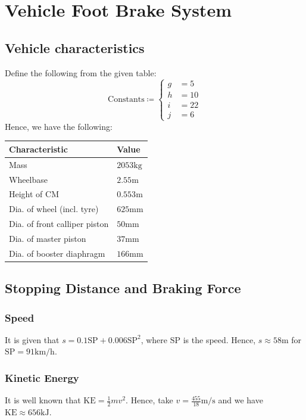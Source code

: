 \documentclass[../main.tex]{subfiles}
\begin{document}
\section{Vehicle Foot Brake System}
\subsection{Vehicle characteristics}
Define the following from the given table:
\[\text{Constants} \coloneq \begin{cases}
		g & = 5  \\
		h & = 10 \\
		i & = 22 \\
		j & = 6
	\end{cases}\]
Hence, we have the following:
\begin{table}[h!]
	\begin{tabularx}{0.5\textwidth} {
			| >{\centering\arraybackslash}X
			| >{\centering\arraybackslash}X |
		}
		\hline
		\textbf{Characteristic}       & \textbf{Value}    \\
		\hline\hline
		Mass                          & $2053\mathrm{kg}$ \\
		\hline
		Wheelbase                     & $2.55\mathrm{m}$  \\
		\hline
		Height of CM                  & $0.553\mathrm{m}$ \\
		\hline
		Dia. of wheel (incl. tyre)    & $625\mathrm{mm}$  \\
		\hline
		Dia. of front calliper piston & $50\mathrm{mm}$   \\
		\hline
		Dia. of master piston         & $37\mathrm{mm}$   \\
		\hline
		Dia. of booster diaphragm     & $166\mathrm{mm}$  \\
		\hline
	\end{tabularx}
\end{table}

\subsection{Stopping Distance and Braking Force}
\subsubsection{Speed}
It is given that $s=0.1\mathrm{SP}+0.006\mathrm{SP}^2$, where $\mathrm{SP}$ is the speed.
Hence, $s \approx58 \mathrm{m}$ for $\mathrm{SP} = 91 \mathrm{km/h}$.
\subsubsection{Kinetic Energy}
It is well known that $\mathrm{KE} = \frac{1}{2}mv^2$.
Hence, take $v = \frac{455}{18} \mathrm{m/s}$ and we have $\mathrm{KE} \approx 656 \mathrm{kJ}$.
\end{document}

